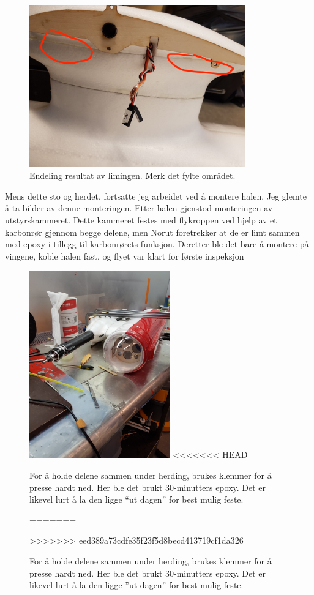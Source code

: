 \documentclass[12pt, a4paper]{article}
\begin{document}
\begin{figure}[ht]
 \centering
 \includegraphics[height=7cm, width = .6\textwidth]{bilder/fylling2_red.jpg}
 \caption[Endelig limeresultat]{Endeling resultat av limingen. Merk det fylte området.}
\end{figure}
\newpage

Mens dette sto og herdet, fortsatte jeg arbeidet ved å montere halen. Jeg glemte å ta bilder av denne monteringen. Etter halen gjenstod monteringen av utstyrskammeret. Dette kammeret festes med flykroppen ved hjelp av et karbonrør gjennom begge delene, men Norut foretrekker at de er limt sammen med epoxy i tillegg til karbonrørets funksjon. Deretter ble det bare å montere på vingene, koble halen fast, og flyet var klart for første inspeksjon

\begin{figure}[ht]
	\centering
	\includegraphics[width = .5\textwidth, height = 8.1cm]{bilder/kammermontering.jpg}
<<<<<<< HEAD
	\caption{For å holde delene sammen under herding, brukes klemmer for å presse hardt ned. Her ble det brukt 30-minutters epoxy. Det er likevel lurt å la den ligge ``ut dagen'' for best mulig feste.}
=======
	\caption[Herding av epoxy]{For å holde delene sammen under herding, brukes klemmer for å presse hardt ned. Her ble det brukt 30-minutters epoxy. Det er likevel lurt å la den ligge ''ut dagen'' for best mulig feste.}
>>>>>>> eed389a73cdfe35f23f5d8becd413719cf1da326
\end{figure}
\newpage
\end{document}
